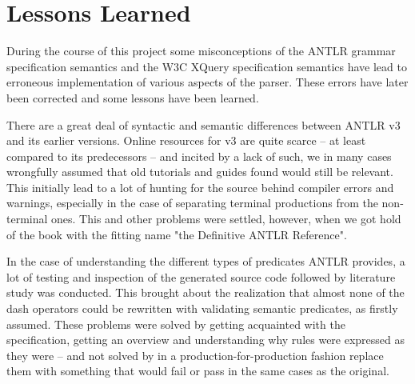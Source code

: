 \section{Lessons Learned}
\label{sect:discussion:deadEnds}
During the course of this project some misconceptions of the ANTLR grammar
specification semantics and the W3C XQuery specification semantics have lead to
erroneous implementation of various aspects of the parser. These errors have
later been corrected and some lessons have been learned.   

There are a great deal of syntactic and semantic differences between ANTLR v3
and its earlier versions. Online resources for v3 are quite scarce -- at least
compared to its predecessors -- and incited by a lack of such, we in many
cases wrongfully assumed that old tutorials and guides found would still be
relevant. This initially lead to a lot of hunting for the source behind compiler
errors and warnings, especially in the case of separating terminal productions
from the non-terminal ones. This and other problems were settled, however, when
we got hold of the book with the fitting name "the Definitive ANTLR
Reference"\cite{definitiveAntlr}.

In the case of understanding the different types of predicates ANTLR provides,
a lot of testing and inspection of the generated source code followed by
literature study was conducted. This brought about the realization that almost
none of the dash operators could be rewritten with validating semantic
predicates, as firstly assumed. These problems were solved by getting
acquainted with the specification, getting an overview and understanding why rules
were expressed as they were -- and not solved by in a production-for-production fashion
replace them with something that would fail or pass in the same cases as the
original.